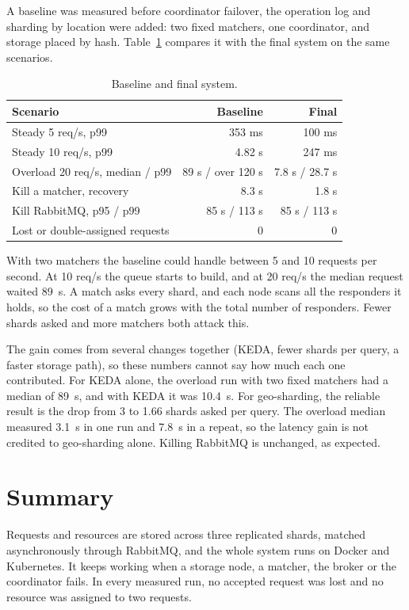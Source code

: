 \documentclass[a4paper,10pt]{article}
\begin{document}
A baseline was measured before coordinator failover, the operation log and sharding by location
were added: two fixed matchers, one coordinator, and storage placed by hash.
Table~\ref{tab:before} compares it with the final system on the same scenarios.

\begin{table}[htbp]
    \centering
    \small
    \begin{tabular}{l r r}
        \toprule
        Scenario & Baseline & Final \\
        \midrule
        Steady 5 req/s, p99 & 353 ms & 100 ms \\
        Steady 10 req/s, p99 & 4.82 s & 247 ms \\
        Overload 20 req/s, median / p99 & 89 s / over 120 s & 7.8 s / 28.7 s \\
        Kill a matcher, recovery & 8.3 s & 1.8 s \\
        Kill RabbitMQ, p95 / p99 & 85 s / 113 s & 85 s / 113 s \\
        Lost or double-assigned requests & 0 & 0 \\
        \bottomrule
    \end{tabular}
    \caption{Baseline and final system.}
    \label{tab:before}
\end{table}

With two matchers the baseline could handle between 5 and 10 requests per second. At 10 req/s the
queue starts to build, and at 20 req/s the median request waited 89~s. A match asks every shard,
and each node scans all the responders it holds, so the cost of a match grows with the total
number of responders. Fewer shards asked and more matchers both attack this.

The gain comes from several changes together (KEDA, fewer shards per query, a faster storage
path), so these numbers cannot say how much each one contributed. For KEDA alone, the overload run
with two fixed matchers had a median of 89~s, and with KEDA it was 10.4~s. For geo-sharding, the
reliable result is the drop from 3 to 1.66 shards asked per query. The overload median measured
3.1~s in one run and 7.8~s in a repeat, so the latency gain is not credited to geo-sharding alone.
Killing RabbitMQ is unchanged, as expected.

\section{Summary}

Requests and resources are stored across three replicated shards, matched asynchronously through
RabbitMQ, and the whole system runs on Docker and Kubernetes. It keeps working when a storage node,
a matcher, the broker or the coordinator fails. In every measured run, no accepted request was lost
and no resource was assigned to two requests.
\end{document}
